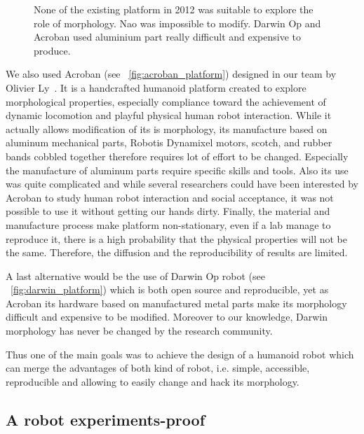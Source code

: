 \begin{figure}[]
\centering
    \hfil
    \hfil
    \caption{None of the existing platform in 2012 was suitable to explore the role of morphology. Nao was impossible to modify. Darwin Op and Acroban used aluminium part really difficult and expensive to produce.}
    \label{fig:2012_Humanoids}
\end{figure}

We also used Acroban (see \figurename~\ref{fig:acroban_platform}) designed in our team by Olivier Ly~\cite{Ly2010}. It is a handcrafted humanoid platform created to explore morphological properties, especially compliance toward the achievement of dynamic locomotion and playful physical human robot interaction.
While it actually allows modification of its is morphology, its manufacture based on aluminum mechanical parts, Robotis Dynamixel motors, scotch, and rubber bands cobbled together therefore requires lot of effort to be changed. Especially the manufacture of aluminum parts require specific skills and tools.
Also its use was quite complicated and while several researchers could have been interested by Acroban to study human robot interaction and social acceptance, it was not possible to use it without getting our hands dirty.
Finally, the material and manufacture process make platform non-stationary, even if a lab manage to reproduce it, there is a high probability that the physical properties will not be the same. Therefore, the diffusion and the reproducibility of results are limited.


A last alternative would be the use of Darwin Op robot (see \figurename~\ref{fig:darwin_platform}) which is both open source and reproducible, yet as Acroban its hardware based on manufactured metal parts make its morphology difficult and expensive to be modified. Moreover to our knowledge, Darwin morphology has never be changed by the research community.

Thus one of the main goals was to achieve the design of a humanoid robot which can merge the advantages of both kind of robot, i.e. simple, accessible, reproducible and allowing to easily change and hack its morphology.

\subsection{A robot experiments-proof} %


